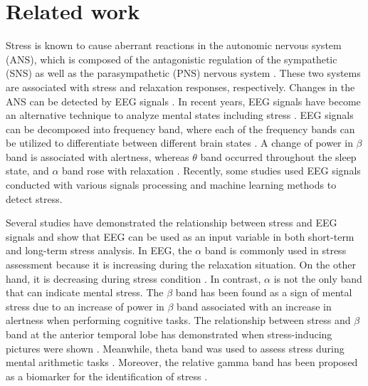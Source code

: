 \documentclass[pdflatex,sn-mathphys]{sn-jnl}%
\theoremstyle{thmstyleone}%
\theoremstyle{thmstyletwo}%
\theoremstyle{thmstylethree}%
\begin{document}

\section{Related work} \label{sec2}
Stress is known to cause aberrant reactions in the autonomic nervous system (ANS), which is composed of the antagonistic regulation of the sympathetic (SNS) as well as the parasympathetic (PNS) nervous system \cite{Cohen2000, Hughes2000}. These two systems are associated with stress and relaxation responses, respectively. Changes in the ANS can be detected by EEG signals \cite{Seo2010}. In recent years, EEG signals have become an alternative technique to analyze mental states including stress \cite{Awang2011, Hu2015}. EEG signals can be decomposed into frequency band\cite{Kulkarni2020}, where each of the frequency bands can be utilized to differentiate between different brain states \cite{Alshargie-2018}. A change of power in $\beta$ band is associated with alertness, whereas $\theta$ band occurred throughout the sleep state, and $\alpha$ band rose with relaxation \cite{Wang2014}. Recently, some studies used EEG signals conducted with various signals processing and machine learning methods to detect stress.

Several studies have demonstrated the relationship between stress and EEG signals and show that EEG can be used as an input variable in both short-term and long-term stress analysis. In EEG, the $\alpha$ band is commonly used in stress assessment because it is increasing during the relaxation situation. On the other hand, it is decreasing during stress condition \cite{Alshargie-2016}. In contrast, $\alpha$ is not the only band that can indicate mental stress. The $\beta$ band has been found as a sign of mental stress due to an increase of power in $\beta$ band associated with an increase in alertness when performing cognitive tasks. The relationship between stress and $\beta$ band at the anterior temporal lobe has demonstrated when stress-inducing pictures were shown \cite{Seo2010, Awang2011, Hamid2010}. Meanwhile, theta band was used to assess stress during mental arithmetic tasks \cite{Grtner2015}. Moreover, the relative gamma band has been proposed as a biomarker for the identification of stress \cite{Arsalan2019}.
\end{document}
